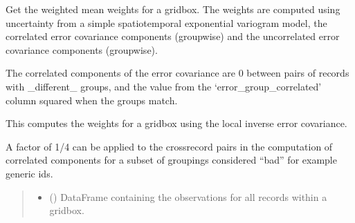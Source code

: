 \documentclass[letterpaper,10pt,english]{sphinxmanual}
\begin{document}

\begin{fulllineitems}
\label{\detokenize{error_covariance:glomar_gridding.error_covariance.grid_box_weighted_sum}}
\pysigstartsignatures
\pysiglinewithargsret
{}
{\sphinxparamcomma {}\sphinxparamcomma {}\sphinxparamcomma {}\sphinxparamcomma {}\sphinxparamcomma {}\sphinxparamcomma {}\sphinxparamcomma {}\sphinxparamcomma {}\sphinxparamcomma {}\sphinxparamcomma {}}
{}
\pysigstopsignatures
\sphinxAtStartPar
Get the weighted mean weights for a grid\sphinxhyphen{}box. The weights are computed using
uncertainty from a simple spatio\sphinxhyphen{}temporal exponential variogram model, the
correlated error covariance components (group\sphinxhyphen{}wise) and the uncorrelated
error covariance components (group\sphinxhyphen{}wise).

\sphinxAtStartPar
The correlated components of the error covariance are 0 between pairs of
records with \_different\_ groups, and the value from the
‘error\_group\_correlated’ column squared when the groups match.

\sphinxAtStartPar
This computes the weights for a grid\sphinxhyphen{}box using the local inverse error
covariance.

\sphinxAtStartPar
A factor of 1/4 can be applied to the cross\sphinxhyphen{}record pairs in the computation
of correlated components for a subset of groupings considered “bad” \sphinxhyphen{} for
example generic ids.
\begin{quote}\begin{description}
\begin{itemize}
\item {}
\sphinxAtStartPar
{} () \textendash{} DataFrame containing the observations for all records within a grid\sphinxhyphen{}box.


\end{itemize}
\end{description}
\end{quote}
\end{fulllineitems}
\end{document}
